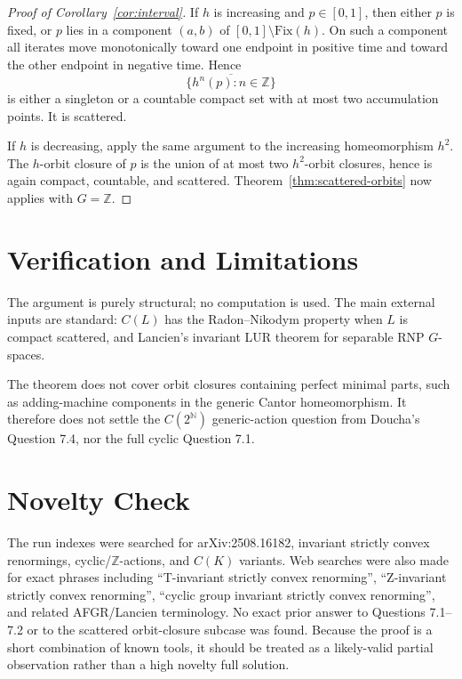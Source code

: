 \documentclass[11pt]{article}
\newcommand{\Z}{\mathbb Z}
\begin{document}
\begin{proof}[Proof of Corollary~\ref{cor:interval}]
If \(h\) is increasing and \(p\in[0,1]\), then either \(p\) is fixed, or \(p\)
lies in a component \((a,b)\) of \([0,1]\setminus \mathrm{Fix}(h)\).  On such a
component all iterates move monotonically toward one endpoint in positive time
and toward the other endpoint in negative time.  Hence
\[
\overline{\{h^n(p):n\in\Z\}}
\]
is either a singleton or a countable compact set with at most two accumulation
points.  It is scattered.

If \(h\) is decreasing, apply the same argument to the increasing
homeomorphism \(h^2\).  The \(h\)-orbit closure of \(p\) is the union of at most
two \(h^2\)-orbit closures, hence is again compact, countable, and scattered.
Theorem~\ref{thm:scattered-orbits} now applies with \(G=\Z\).
\end{proof}

\section*{Verification and Limitations}

The argument is purely structural; no computation is used.  The main external
inputs are standard: \(C(L)\) has the Radon--Nikodym property when \(L\) is
compact scattered, and Lancien's invariant LUR theorem for separable RNP
\(G\)-spaces.

The theorem does not cover orbit closures containing perfect minimal parts,
such as adding-machine components in the generic Cantor homeomorphism.  It
therefore does not settle the \(C(2^\mathbb N)\) generic-action question from
Doucha's Question 7.4, nor the full cyclic Question 7.1.

\section*{Novelty Check}

The run indexes were searched for arXiv:2508.16182, invariant strictly convex
renormings, cyclic/\(\Z\)-actions, and \(C(K)\) variants.  Web searches were
also made for exact phrases including ``T-invariant strictly convex
renorming'', ``Z-invariant strictly convex renorming'', ``cyclic group
invariant strictly convex renorming'', and related AFGR/Lancien terminology.
No exact prior answer to Questions 7.1--7.2 or to the scattered orbit-closure
subcase was found.  Because the proof is a short combination of known tools, it
should be treated as a likely-valid partial observation rather than a high
novelty full solution.
\end{document}
